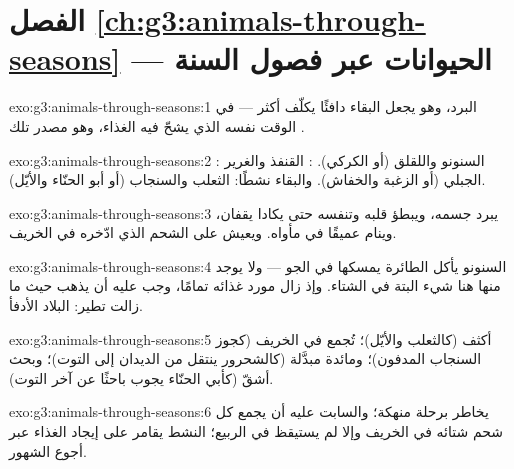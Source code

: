 \section*{الفصل \ref{ch:g3:animals-through-seasons} --- الحيوانات عبر فصول السنة}

\begin{solution}{exo:g3:animals-through-seasons:1}
البرد، وهو يجعل البقاء دافئًا يكلّف  أكثر --- في الوقت نفسه
الذي يشحّ فيه الغذاء، وهو مصدر تلك .
\end{solution}

\begin{solution}{exo:g3:animals-through-seasons:2}
: السنونو واللقلق (أو الكركي). : القنفذ والغرير
الجبلي (أو الزغبة والخفاش). والبقاء نشطًا: الثعلب والسنجاب (أو
أبو الحنّاء والأيّل).
\end{solution}

\begin{solution}{exo:g3:animals-through-seasons:3}
يبرد جسمه، ويبطؤ قلبه وتنفسه حتى يكادا يقفان، وينام عميقًا في
مأواه. ويعيش على الشحم الذي ادّخره في الخريف.
\end{solution}

\begin{solution}{exo:g3:animals-through-seasons:4}
السنونو يأكل  الطائرة يمسكها في الجو --- ولا يوجد منها هنا
شيء البتة في الشتاء. وإذ زال مورد غذائه تمامًا، وجب عليه أن يذهب
حيث ما زالت  تطير: البلاد الأدفأ.
\end{solution}

\begin{solution}{exo:g3:animals-through-seasons:5}
 أكثف (كالثعلب والأيّل)؛  تُجمع في الخريف
(كجوز السنجاب المدفون)؛ ومائدة مبدَّلة (كالشحرور ينتقل من الديدان
إلى التوت)؛ وبحث أشقّ (كأبي الحنّاء يجوب باحثًا عن آخر التوت).
\end{solution}

\begin{solution}{exo:g3:animals-through-seasons:6}
 يخاطر برحلة منهكة؛ والسابت عليه أن يجمع كل شحم شتائه في
الخريف وإلا لم يستيقظ في الربيع؛  النشط يقامر على إيجاد
الغذاء عبر أجوع الشهور.
\end{solution}

